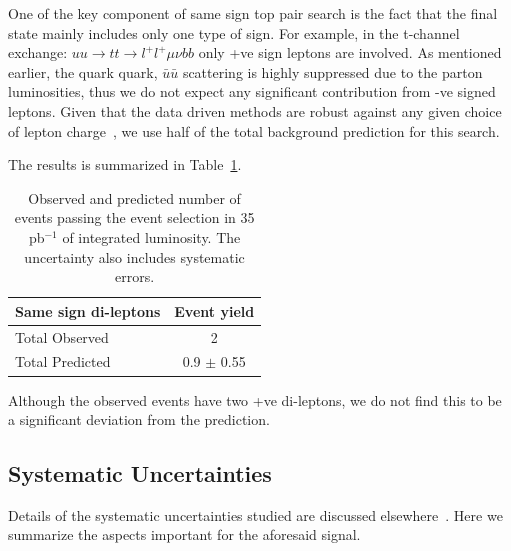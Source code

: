 One of the key component of same sign top pair search is the fact that the final state mainly  
includes only one type of sign. For example, in the t-channel exchange: $ uu \rightarrow tt \rightarrow l^+ l^+ \mu \nu b b$
only +ve sign leptons are involved. As mentioned earlier, the quark quark, $\bar{u}\bar{u}$ scattering 
is highly suppressed due to the parton luminosities, thus we do not expect any significant contribution 
from -ve signed leptons. Given that the data driven methods are robust against any given choice of lepton 
charge~\cite{fakenote1}, we use half of the total background prediction for this search.

The results is summarized in Table~\ref{tab:sm_preditcion}.

\begin{table}[hbt]
\begin{center}
\begin{tabular}{|l|c|}\hline
Same sign di-leptons & Event yield \\ \hline
Total Observed & 2 \\
Total Predicted & 0.9 $\pm$ 0.55 \\
\hline
\end{tabular}
\caption{ Observed and predicted number of events passing the event selection in 35 pb$^{-1}$ of integrated luminosity. 
The uncertainty also includes systematic errors.\label{tab:sm_preditcion}}
\end{center}
\end{table}

Although the observed events have two +ve di-leptons, we do not find this to be a significant deviation 
from the prediction.

\subsection{Systematic Uncertainties}
\label{sec:sssystematics}

Details of the systematic uncertainties studied are discussed elsewhere~\cite{ssnote1}. Here we summarize
the aspects important for the aforesaid signal.


